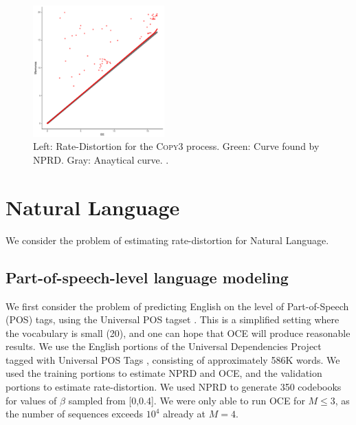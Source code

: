 \documentclass[11pt,letterpaper]{article}
\newif \ifcomment
\newcommand\rljf[1]{\ifcomment{{\color{blue}(#1)}}\else{}\fi}
\begin{document}
\begin{figure}
\includegraphics[width=0.45\textwidth]{code/figures/repeat3-ee-mem-frontier.pdf}
	\caption{Left: Rate-Distortion for the \textsc{Copy3} process. Green: Curve found by NPRD. Gray: Anaytical curve. \rljf{Red not green? Also y axis should be Memory, not Memories. Also let's label as Memory (nats) throughout (or bits), and Excess Entropy on the x axis throughout.}.}\label{fig:repeat}
\end{figure}



\section{Natural Language}

We consider the problem of estimating rate-distortion for Natural Language. \rljf{Some motivation for why this is cool and interesting, maybe in parallel with the Bentz et al entropy paper, and other information theoretic linguistic complexity papers like Koplenig et al, and Dembowski's work}
%
%
%
%
%

\subsection{Part-of-speech-level language modeling}

We first consider the problem of predicting English on the level of Part-of-Speech (POS) tags, using the Universal POS tagset \citep{petrov-universal-2012}. 
This is a simplified setting where the vocabulary is small (20), and one can hope that OCE will produce reasonable results.
We use the English portions of the Universal Dependencies Project~\citep{nivre-universal-2017} tagged with Universal POS Tags \citep{petrov-universal-2012}, consisting of approximately 586K words.
We used the training portions to estimate NPRD and OCE, and the validation portions to estimate rate-distortion.
We used NPRD to generate 350 codebooks for values of $\beta$ sampled from [0,0.4].
We were only able to run OCE for $M \leq 3$, as the number of sequences exceeds $10^4$ already at $M=4$.
\end{document}
